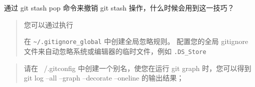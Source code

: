 \documentclass{../../../latex/lcm}
\begin{document}
通过 git stash pop 命令来撤销 git stash 操作，什么时候会用到这一技巧？



\begin{quote}
您可以通过执行


在 \verb|~/.gitignore_global| 中创建全局忽略规则。
配置您的全局 gitignore 文件来自动忽略系统或编辑器的临时文件，例如 \verb|.DS_Store|
\end{quote}




\begin{quote}
请在 ~/.gitconfig 中创建一个别名，使您在运行 git graph 时，您可以得到 git log --all --graph --decorate --oneline 的输出结果；
\end{quote}




\end{document}
